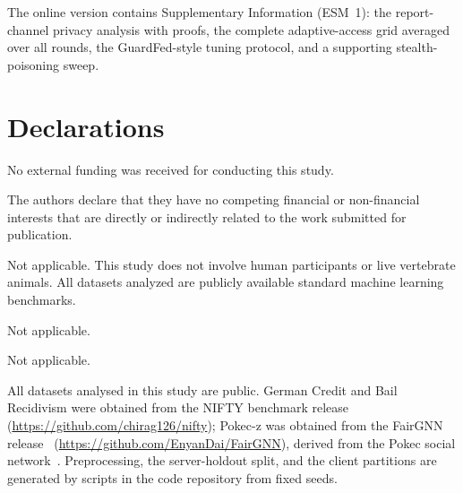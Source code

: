\documentclass[pdflatex,sn-mathphys-num]{sn-jnl}
\begin{document}









\backmatter

The online version contains Supplementary Information (ESM~1): the report-channel privacy analysis with proofs, the complete adaptive-access grid averaged over all rounds, the GuardFed-style tuning protocol, and a supporting stealth-poisoning sweep.

\section*{Declarations}

No external funding was received for conducting this study.

The authors declare that they have no competing financial or non-financial interests that are directly or indirectly related to the work submitted for publication.

Not applicable. This study does not involve human participants or live vertebrate animals. All datasets analyzed are publicly available standard machine learning benchmarks.

Not applicable.

Not applicable.

All datasets analysed in this study are public. German Credit and Bail Recidivism were obtained from the NIFTY benchmark release~\citep{agarwal2021towards} (\url{https://github.com/chirag126/nifty}); Pokec-z was obtained from the FairGNN release~\citep{dai2021say} (\url{https://github.com/EnyanDai/FairGNN}), derived from the Pokec social network~\citep{takac2012data}. Preprocessing, the server-holdout split, and the client partitions are generated by scripts in the code repository from fixed seeds.
\end{document}
